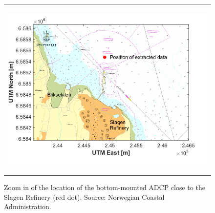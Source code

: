 \begin{figure}[htb]
  \begin{center}
    \begin{tabular}{c}
      \includegraphics*[height=9cm]{Figurer/Slagen_kart} \\ 
    \end{tabular}
    \caption{\small Zoom in of the location of the bottom-mounted ADCP close to the Slagen Refinery (red dot). Source: Norwegian Coastal Administration.}
    \label{fig:Slagen-kart}
  \end{center}
\end{figure}


